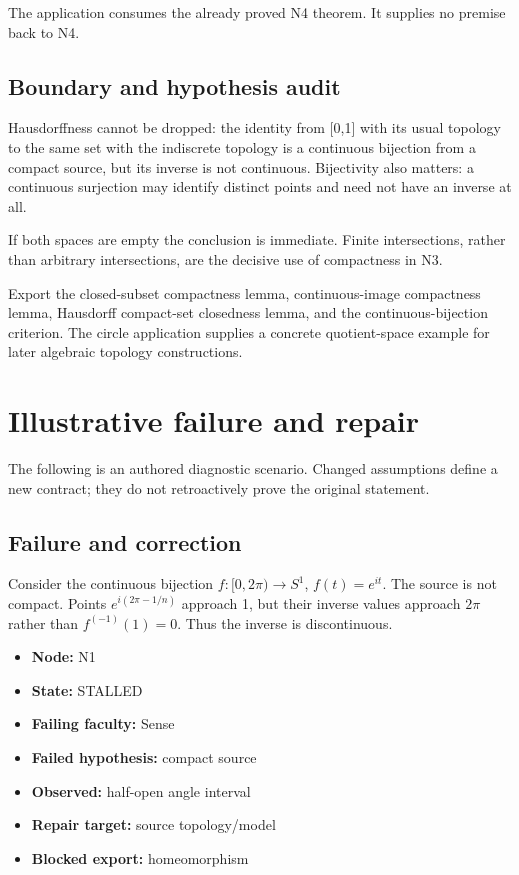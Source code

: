 \documentclass[preprint,12pt,aps,pra,showkeys,amsmath,amssymb,superscriptaddress,floatfix]{revtex4-2}
\theoremstyle{definition}
\theoremstyle{remark}
\begin{document}
The application consumes the already proved N4 theorem. It supplies no
premise back to N4.

\subsection{Boundary and hypothesis audit}

Hausdorffness cannot be dropped: the identity from {[}0,1{]} with its
usual topology to the same set with the indiscrete topology is a
continuous bijection from a compact source, but its inverse is not
continuous. Bijectivity also matters: a continuous surjection may
identify distinct points and need not have an inverse at all.

If both spaces are empty the conclusion is immediate. Finite
intersections, rather than arbitrary intersections, are the decisive use
of compactness in N3.

Export the closed-subset compactness lemma, continuous-image compactness
lemma, Hausdorff compact-set closedness lemma, and the
continuous-bijection criterion. The circle application supplies a
concrete quotient-space example for later algebraic topology
constructions.

\section{Illustrative failure and repair}

The following is an authored diagnostic scenario. Changed assumptions
define a new contract; they do not retroactively prove the original
statement.

\subsection{Failure and correction}
Consider the continuous bijection \(f:[0,2\pi)\to S^1\),
\(f(t)=e^{it}\). The source is not compact. Points \(e^{i(2\pi-1/n)}\)
approach 1, but their inverse values approach \(2\pi\) rather than
\(f^{(-1)}(1)=0\). Thus the inverse is discontinuous.

\begin{itemize}
\item
  \textbf{Node:} N1
\item
  \textbf{State:} STALLED
\item
  \textbf{Failing faculty:} Sense
\item
  \textbf{Failed hypothesis:} compact source
\item
  \textbf{Observed:} half-open angle interval
\item
  \textbf{Repair target:} source topology/model
\item
  \textbf{Blocked export:} homeomorphism
\end{itemize}
\end{document}
